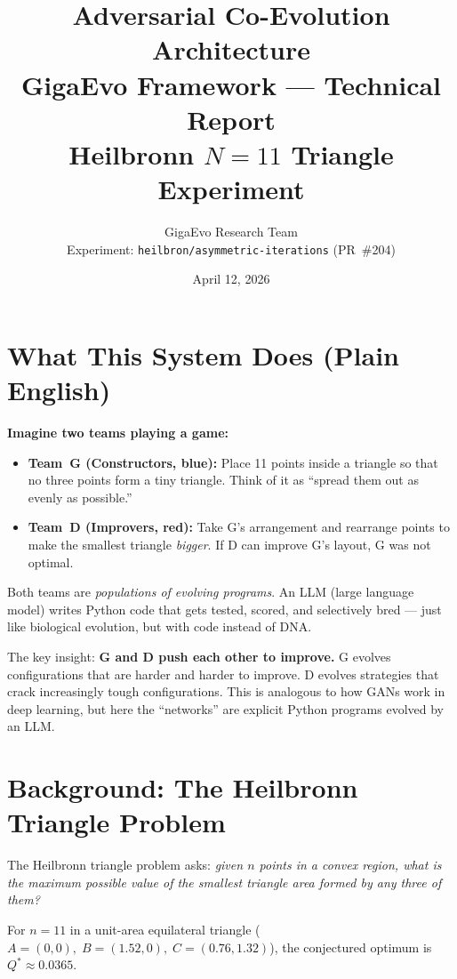 \documentclass[11pt,a4paper]{article}
\title{%
  \vspace{-1cm}
  {\LARGE\bfseries Adversarial Co-Evolution Architecture}\\[0.3cm]
  {\Large GigaEvo Framework --- Technical Report}\\[0.3cm]
  {\normalsize Heilbronn $N\!=\!11$ Triangle Experiment}
}
\author{%
  GigaEvo Research Team\\
  {\small Experiment: \texttt{heilbron/asymmetric-iterations} (PR~\#204)}
}
\date{April 12, 2026}
\newcommand{\Qstar}{Q^{*}}      %
\begin{document}
\maketitle
\thispagestyle{fancy}

\section{What This System Does (Plain English)}

\begin{eli5box}
\textbf{Imagine two teams playing a game:}
\begin{itemize}[nosep]
  \item \textbf{Team~G (Constructors, blue):} Place 11 points inside a triangle so that no three points form a tiny triangle. Think of it as ``spread them out as evenly as possible.''
  \item \textbf{Team~D (Improvers, red):} Take G's arrangement and rearrange points to make the smallest triangle \emph{bigger}. If D can improve G's layout, G was not optimal.
\end{itemize}

Both teams are \emph{populations of evolving programs}. An LLM (large language model) writes Python code that gets tested, scored, and selectively bred --- just like biological evolution, but with code instead of DNA.

The key insight: \textbf{G and D push each other to improve.} G evolves configurations that are harder and harder to improve. D evolves strategies that crack increasingly tough configurations. This is analogous to how GANs work in deep learning, but here the ``networks'' are explicit Python programs evolved by an LLM.
\end{eli5box}

\section{Background: The Heilbronn Triangle Problem}

The Heilbronn triangle problem asks: \emph{given $n$ points in a convex region, what is the maximum possible value of the smallest triangle area formed by any three of them?}

For $n=11$ in a unit-area equilateral triangle ($A{=}(0,0),\; B{=}(1.52,0),\; C{=}(0.76,1.32)$), the conjectured optimum is $\Qstar \approx 0.0365$.
\end{document}
